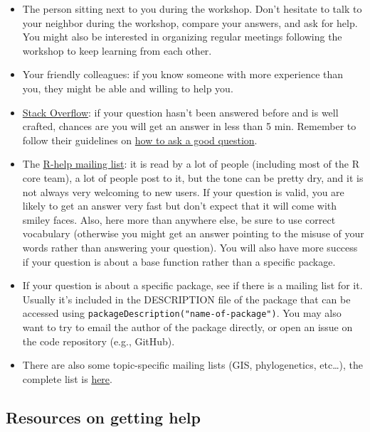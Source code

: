 \documentclass[
]{book}
\providecommand{\tightlist}{%
  \setlength{\itemsep}{0pt}\setlength{\parskip}{0pt}}
\begin{document}
\begin{itemize}
\tightlist
\item
  The person sitting next to you during the workshop. Don't hesitate to talk to
  your neighbor during the workshop, compare your answers, and ask for
  help. You might also be interested in organizing regular meetings following
  the workshop to keep learning from each other.
\item
  Your friendly colleagues: if you know someone with more experience than you,
  they might be able and willing to help you.
\item
  \href{http://stackoverflow.com/questions/tagged/r}{Stack Overflow}: if your question
  hasn't been answered before and is well crafted, chances are you will get an
  answer in less than 5 min. Remember to follow their guidelines on \href{http://stackoverflow.com/help/how-to-ask}{how to ask
  a good question}.
\item
  The \href{https://stat.ethz.ch/mailman/listinfo/r-help}{R-help mailing list}: it is
  read by a lot of people (including most of the R core team), a lot of people
  post to it, but the tone can be pretty dry, and it is not always very
  welcoming to new users. If your question is valid, you are likely to get an
  answer very fast but don't expect that it will come with smiley faces. Also,
  here more than anywhere else, be sure to use correct vocabulary (otherwise
  you might get an answer pointing to the misuse of your words rather than
  answering your question). You will also have more success if your question is
  about a base function rather than a specific package.
\item
  If your question is about a specific package, see if there is a mailing list
  for it. Usually it's included in the DESCRIPTION file of the package that can
  be accessed using \texttt{packageDescription("name-of-package")}. You may also want
  to try to email the author of the package directly, or open an issue on the
  code repository (e.g., GitHub).
\item
  There are also some topic-specific mailing lists (GIS, phylogenetics, etc\ldots),
  the complete list is \href{http://www.r-project.org/mail.html}{here}.
\end{itemize}

\hypertarget{resources-on-getting-help}{%
\subsection{Resources on getting help}\label{resources-on-getting-help}}
\end{document}
